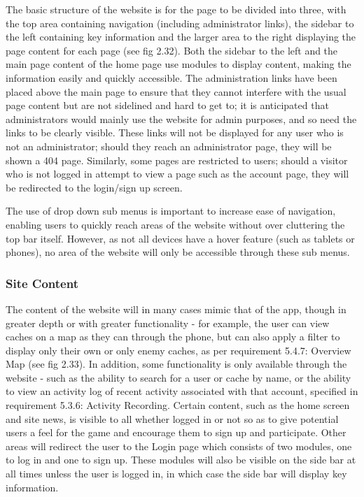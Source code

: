 The basic structure of the website is for the page to be divided into three, with the top area containing navigation (including administrator links), the sidebar to the left containing key information and the larger area to the right displaying the page content for each page (see fig 2.32). Both the sidebar to the left and the main page content of the home page use modules to display content, making the information easily and quickly accessible. The administration links have been placed above the main page to ensure that they cannot interfere with the usual page content but are not sidelined and hard to get to; it is anticipated that administrators would mainly use the website for admin purposes, and so need the links to be clearly visible. These links will not be displayed for any user who is not an administrator; should they reach an administrator page, they will be shown a 404 page. Similarly, some pages are restricted to users; should a visitor who is not logged in attempt to view a page such as the account page, they will be redirected to the login/sign up screen.

The use of drop down sub menus is important to increase ease of navigation, enabling users to quickly reach areas of the website without over cluttering the top bar itself. However, as not all devices have a hover feature (such as tablets or phones), no area of the website will only be accessible through these sub menus.

\subsubsection{Site Content}

The content of the website will in many cases mimic that of the app, though in greater depth or with greater functionality - for example, the user can view caches on a map as they can through the phone, but can also apply a filter to display only their own or only enemy caches, as per requirement 5.4.7: Overview Map (see fig 2.33). In addition, some functionality is only available through the website - such as the ability to search for a user or cache by name, or the ability to view an activity log of recent activity associated with that account, specified in requirement 5.3.6: Activity Recording. Certain content, such as the home screen and site news, is visible to all whether logged in or not so as to give potential users a feel for the game and encourage them to sign up and participate. Other areas will redirect the user to the Login page which consists of two modules, one to log in and one to sign up. These modules will also be visible on the side bar at all times unless the user is logged in, in which case the side bar will display key information.

